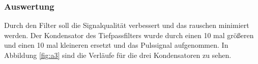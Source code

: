 \documentclass[12pt,a4paper]{article}
\begin{document}
\subsubsection*{Auswertung}

Durch den Filter soll die Signalqualität verbessert und das rauschen minimiert werden. Der Kondensator des Tiefpassfilters wurde durch einen 10 mal größeren und einen 10 mal kleineren ersetzt und das Pulssignal aufgenommen. In Abbildung \ref{fig:a3} sind die Verläufe für die drei Kondensatoren zu sehen.
\end{document}
